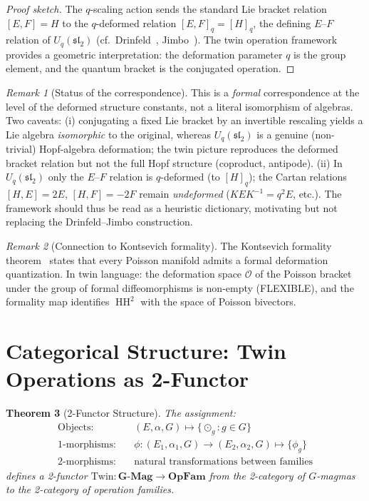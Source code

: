 \documentclass[11pt,twocolumn]{article}
\theoremstyle{plain}\newtheorem{theorem}{Theorem}\newtheorem{proposition}[theorem]{Proposition}\newtheorem{corollary}[theorem]{Corollary}\newtheorem{lemma}[theorem]{Lemma}
\theoremstyle{definition}\newtheorem{definition}[theorem]{Definition}\newtheorem{example}[theorem]{Example}
\theoremstyle{remark}\newtheorem{remark}[theorem]{Remark}
\newcommand{\HH}{\operatorname{HH}}
\begin{document}
\begin{proof}[Proof sketch]
The $q$-scaling action sends the standard Lie bracket relation $[E, F] = H$ to the $q$-deformed relation $[E, F]_q = [H]_q$, the defining $E$--$F$ relation of $U_q(\mathfrak{sl}_2)$ (cf.\ Drinfeld~\cite{drinfeld1987}, Jimbo~\cite{jimbo1985}). The twin operation framework provides a geometric interpretation: the deformation parameter $q$ is the group element, and the quantum bracket is the conjugated operation.
\end{proof}

\begin{remark}[Status of the correspondence]
This is a \emph{formal} correspondence at the level of the deformed structure constants, not a literal isomorphism of algebras. Two caveats: (i) conjugating a fixed Lie bracket by an invertible rescaling yields a Lie algebra \emph{isomorphic} to the original, whereas $U_q(\mathfrak{sl}_2)$ is a genuine (non-trivial) Hopf-algebra deformation; the twin picture reproduces the deformed bracket relation but not the full Hopf structure (coproduct, antipode). (ii) In $U_q(\mathfrak{sl}_2)$ only the $E$--$F$ relation is $q$-deformed (to $[H]_q$); the Cartan relations $[H,E] = 2E$, $[H,F] = -2F$ remain \emph{undeformed} ($KEK^{-1} = q^2 E$, etc.). The framework should thus be read as a heuristic dictionary, motivating but not replacing the Drinfeld--Jimbo construction.
\end{remark}

\begin{remark}[Connection to Kontsevich formality]
The Kontsevich formality theorem~\cite{kontsevich1997} states that every Poisson manifold admits a formal deformation quantization. In twin language: the deformation space $\mathcal{O}$ of the Poisson bracket under the group of formal diffeomorphisms is non-empty (FLEXIBLE), and the formality map identifies $\HH^2$ with the space of Poisson bivectors.
\end{remark}


\section{Categorical Structure: Twin Operations as 2-Functor}
\label{sec:categorical}

\begin{theorem}[2-Functor Structure]\label{thm:2functor}
The assignment:
\begin{align}
\text{Objects:}&\quad (E, \alpha, G) \mapsto \{\odot_g : g \in G\} \\
\text{1-morphisms:}&\quad \phi: (E_1, \alpha_1, G) \to (E_2, \alpha_2, G) \mapsto \{\phi_g\} \\
\text{2-morphisms:}&\quad \text{natural transformations between families}
\end{align}
defines a 2-functor $\mathrm{Twin}: \mathbf{G\text{-}Mag} \to \mathbf{OpFam}$ from the 2-category of $G$-magmas to the 2-category of operation families.
\end{theorem}
\end{document}
